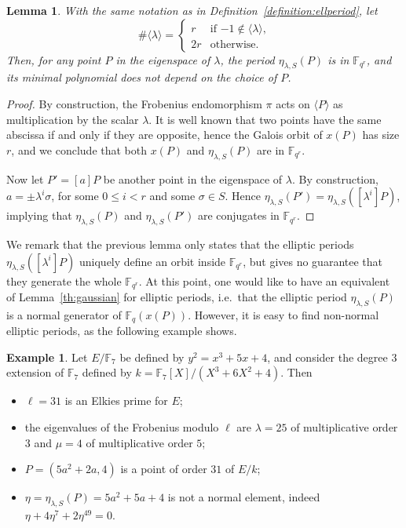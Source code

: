 \documentclass{mcom-l}
\theoremstyle{plain}
\newtheorem{lemma}[theorem]{Lemma}
\theoremstyle{definition}
\newtheorem{example}[theorem]{Example}
\newcommand{\F}{\ensuremath{\mathbb{F}}}
\begin{document}
\begin{lemma}
  \label{lemma:ellperiods-order}
  With the same notation as in Definition~\ref{definition:ellperiod},
  let
  \begin{equation*}
    \#\langle\lambda\rangle =
    \begin{cases}
      r & \text{if $-1\notin\langle\lambda\rangle$,}\\
      2r & \text{otherwise.}
    \end{cases}
  \end{equation*}
  Then, for any point $P$ in the eigenspace of $\lambda$, the period
  $\eta_{\lambda,S}(P)$ is in $\F_{q^r}$, and its minimal polynomial
  does not depend on the choice of $P$.
\end{lemma}
\begin{proof}
  By construction, the Frobenius endomorphism $\pi$ acts on
  $\langle P\rangle$ as multiplication by the scalar $\lambda$. It is
  well known that two points have the same abscissa if and only if
  they are opposite, hence the Galois orbit of $x(P)$ has size $r$,
  and we conclude that both $x(P)$ and $\eta_{\lambda,S}(P)$ are in
  $\F_{q^r}$.

  Now let $P'=[a]P$ be another point in the eigenspace of
  $\lambda$. By construction, $a=\pm \lambda^i\sigma$, for some
  $0\le i<r$ and some $\sigma\in S$. Hence
  $\eta_{\lambda,S}(P')=\eta_{\lambda,S}([\lambda^i]P)$, implying that
  $\eta_{\lambda,S}(P)$ and $\eta_{\lambda,S}(P')$ are conjugates in
  $\F_{q^r}$.
\end{proof}

We remark that the previous lemma only states that the elliptic
periods $\eta_{\lambda,S}([\lambda^i]P)$ uniquely define an orbit
inside $\F_{q^r}$, but gives no guarantee that they generate the whole
$\F_{q^r}$. %
At this point, one would like to have an equivalent of
Lemma~\ref{th:gaussian} for elliptic periods, i.e.\ that the elliptic
period $\eta_{\lambda,S}(P)$ is a normal generator of $\F_q(x(P))$.
However, it is easy to find non-normal elliptic periods, as the
following example shows.

\begin{example}
\label{ex:non-normal}
  Let $E/\F_7$ be defined by $y^2 = x^3 + 5 x + 4$, and consider the
  degree $3$ extension of $\F_7$ defined by
  $k=\F_7[X]/(X^3 + 6 X^2 + 4)$. Then
  \begin{itemize}
  \item $\ell = 31$ is an Elkies prime for $E$;
  \item the eigenvalues of the Frobenius modulo $\ell$ are
    $\lambda = 25$ of multiplicative order $3$ and $\mu = 4$ of
    multiplicative order $5$;
  \item $P = (5 a^2+2 a, 4)$ is a point of order $31$ of $E/k$;
  \item $\eta=\eta_{\lambda,S}(P) = 5 a^2 + 5 a + 4$ is not a normal
    element, indeed
    $\eta + 4 \eta^7 + 2 \eta^{49} = 0$.
  \end{itemize}
\end{example}
\end{document}
